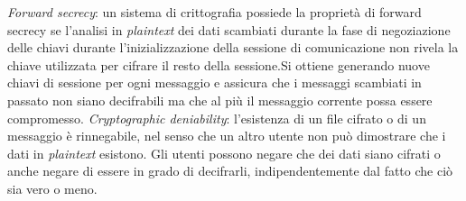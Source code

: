 \begin{frame}
{        \textit{Forward secrecy}: un sistema di crittografia possiede la proprietà di forward secrecy se l'analisi in \textit{plaintext} dei dati scambiati durante la fase di negoziazione delle chiavi durante l'inizializzazione della sessione di comunicazione non rivela la chiave utilizzata per cifrare il resto della sessione.\newline Si ottiene generando nuove chiavi di sessione per ogni messaggio e assicura che i messaggi scambiati in passato non siano decifrabili ma che al più il messaggio corrente possa essere compromesso.\newline
        \textit{Cryptographic deniability}: l'esistenza di un file cifrato o di un messaggio è rinnegabile, nel senso che un altro utente non può dimostrare che i dati in \textit{plaintext} esistono. Gli utenti possono negare che dei dati siano cifrati o anche negare di essere in grado di decifrarli, indipendentemente dal fatto che ciò sia vero o meno.
    }
\end{frame}


